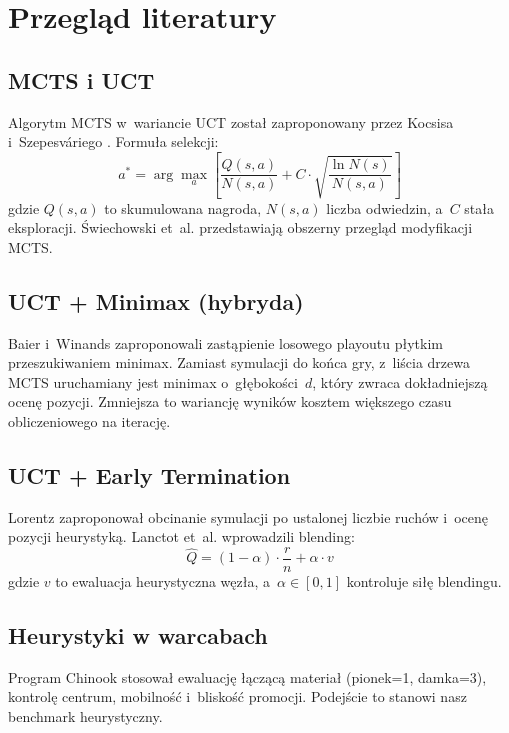 \documentclass[12pt,a4paper]{article}
\begin{document}
\section{Przegląd literatury}
\label{sec:literature}

\subsection{MCTS i UCT}
Algorytm MCTS w~wariancie UCT został zaproponowany przez Kocsisa i~Szepesváriego \cite{kocsis2006bandit}. Formuła selekcji:
\begin{equation}
  a^* = \arg\max_a \left[ \frac{Q(s,a)}{N(s,a)} + C \cdot \sqrt{\frac{\ln N(s)}{N(s,a)}} \right]
  \label{eq:ucb1}
\end{equation}
gdzie $Q(s,a)$ to skumulowana nagroda, $N(s,a)$ liczba odwiedzin, a~$C$ stała eksploracji. Świechowski et~al. \cite{swiechowski2023mcts} przedstawiają obszerny przegląd modyfikacji MCTS.

\subsection{UCT + Minimax (hybryda)}
Baier i~Winands \cite{baier2014mcts} zaproponowali zastąpienie losowego playoutu płytkim przeszukiwaniem minimax. Zamiast symulacji do końca gry, z~liścia drzewa MCTS uruchamiany jest minimax o~głębokości~$d$, który zwraca dokładniejszą ocenę pozycji. Zmniejsza to wariancję wyników kosztem większego czasu obliczeniowego na iterację.

\subsection{UCT + Early Termination}
Lorentz \cite{lorentz2016evaluation} zaproponował obcinanie symulacji po ustalonej liczbie ruchów i~ocenę pozycji heurystyką. Lanctot et~al. \cite{lanctot2014mcts} wprowadzili blending:
\begin{equation}
  \hat{Q} = (1 - \alpha) \cdot \frac{r}{n} + \alpha \cdot v
  \label{eq:blending}
\end{equation}
gdzie $v$ to ewaluacja heurystyczna węzła, a~$\alpha \in [0,1]$ kontroluje siłę blendingu.

\subsection{Heurystyki w warcabach}
Program Chinook \cite{schaeffer1997one} stosował ewaluację łączącą materiał (pionek=1, damka=3), kontrolę centrum, mobilność i~bliskość promocji. Podejście to stanowi nasz benchmark heurystyczny.
\end{document}
